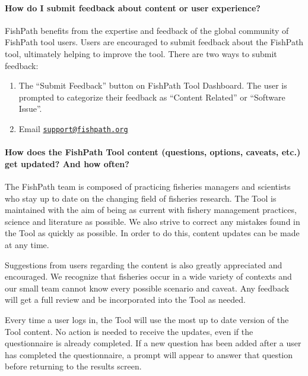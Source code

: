 \documentclass[
  11pt,
]{book}
\providecommand{\tightlist}{%
  \setlength{\itemsep}{0pt}\setlength{\parskip}{0pt}}
\begin{document}
\hypertarget{faq-feedback}{%
\paragraph{How do I submit feedback about content or user experience?}\label{faq-feedback}}

FishPath benefits from the expertise and feedback of the global community of FishPath tool users. Users are encouraged to submit feedback about the FishPath tool, ultimately helping to improve the tool. There are two ways to submit feedback:

\begin{enumerate}
\def\labelenumi{\arabic{enumi}.}
\tightlist
\item
  The ``Submit Feedback'' button on FishPath Tool Dashboard. The user is prompted to categorize their feedback as ``Content Related'' or ``Software Issue''.
\item
  Email \href{mailto:support@fishpath.org}{\nolinkurl{support@fishpath.org}}
\end{enumerate}

\hypertarget{faq-content-updates}{%
\paragraph{How does the FishPath Tool content (questions, options, caveats, etc.) get updated? And how often?}\label{faq-content-updates}}

The FishPath team is composed of practicing fisheries managers and scientists who stay up to date on the changing field of fisheries research. The Tool is maintained with the aim of being as current with fishery management practices, science and literature as possible. We also strive to correct any mistakes found in the Tool as quickly as possible. In order to do this, content updates can be made at any time.

Suggestions from users regarding the content is also greatly appreciated and encouraged. We recognize that fisheries occur in a wide variety of contexts and our small team cannot know every possible scenario and caveat. Any feedback will get a full review and be incorporated into the Tool as needed.

Every time a user logs in, the Tool will use the most up to date version of the Tool content. No action is needed to receive the updates, even if the questionnaire is already completed. If a new question has been added after a user has completed the questionnaire, a prompt will appear to answer that question before returning to the results screen.
\end{document}
